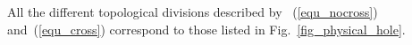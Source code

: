 \documentclass[conference]{IEEEtran}
\begin{document}

All the different topological divisions described by ~(\ref{equ_nocross}) and~(\ref{equ_cross}) correspond to those listed in Fig.~\ref{fig_physical_hole}.
 
\end{document}

